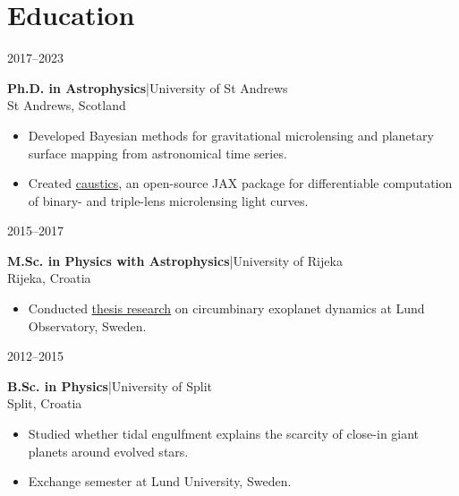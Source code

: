 \documentclass[11pt,a4paper]{article}
\newcommand{\cvitem}[2]{%
  \par\noindent\begin{minipage}[t]{24mm}
    \raggedright\small\sffamily\leavevmode\color{muted}#1
  \end{minipage}\hfill\begin{minipage}[t]{\dimexpr\linewidth-28mm\relax}
    \raggedright #2
  \end{minipage}\par\vspace{4pt}}
\newcommand{\cventry}[6]{%
  \cvitem{#1}{\textbf{#2}\enspace|\enspace #3\\[-1pt]
    {\small\sffamily\color{muted}#4}\if\relax\detokenize{#5}\relax\else\enspace #5\fi
    \par\vspace{2pt}#6}}
\begin{document}
\section{Education}
\cventry{2017--2023}{Ph.D. in Astrophysics}{University of St Andrews}
{St Andrews, Scotland}{}{
    \begin{itemize}
        \item Developed Bayesian methods for gravitational microlensing and planetary surface mapping from astronomical time series.
        \item Created \href{https://github.com/fbartolic/caustics}{caustics}, an open-source JAX package for differentiable computation of binary- and triple-lens microlensing light curves.
    \end{itemize}}
\cventry{2015--2017}{M.Sc. in Physics with Astrophysics}{University of Rijeka}
{Rijeka, Croatia}{}{
    \begin{itemize}
        \item Conducted \href{https://github.com/fbartolic/master_thesis}{thesis research} on circumbinary exoplanet dynamics at Lund Observatory, Sweden.
    \end{itemize}}
\cventry{2012--2015}{B.Sc. in Physics}{University of Split}
{Split, Croatia}{}{
    \begin{itemize}
        \item Studied whether tidal engulfment explains the scarcity of close-in giant planets around evolved stars.
        \item Exchange semester at Lund University, Sweden.
    \end{itemize}}

\newpage
\end{document}
